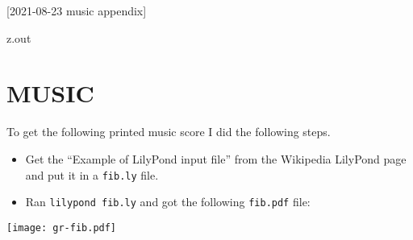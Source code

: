 [2021-08-23 music appendix]

\begin{VerbatimOut}{z.out}
\chapter{MUSIC}

To get the following printed music score I did the following steps.
\begin{itemize}
  \item
    Get the ``Example of LilyPond input file''
    from the Wikipedia LilyPond page \cite{wikipedia-lilypond}
    and put it in a \verb+fib.ly+ file.
  \item
    Ran \verb+lilypond fib.ly+ and got the following \verb+fib.pdf+ file:
\end{itemize}

\noindent \texttt{[image: gr-fib.pdf]}
\end{VerbatimOut}

\MyIO

